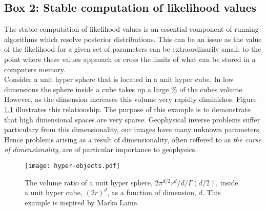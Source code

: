 \begin{tcolorbox}
\chapter{Box 2: Stable computation of likelihood values}
\label{Box2}

The stable computation of likelihood values is an essential component of running algorithms which resolve posterior distributions. This can be an issue as the value of the likelihood for a given set of parameters can be extraordinarily small, to the point where these values approach or cross the limits of what can be stored in a computers memory. \\

Consider a unit hyper sphere that is located in a unit hyper cube. In low dimensions the sphere inside a cube takes up a large \% of the cubes volume. However, as the dimension increases this volume very rapidly diminishes. Figure \ref{hyper-objects} illustrates this relationship. The purpose of this example is to demonstrate that high dimensional spaces are very sparse. Geophysical inverse problems suffer particulary from this dimensionality, our images have many unknown parameters. Hence problems arising as a result of dimensionality, often reffered to as \textit{the curse of dimensionality}, are of particular importance to geophysics. \\

\begin{figure}[H]
	\centering
	\texttt{[image: hyper-objects.pdf]}
	\caption{The volume ratio of a unit hyper sphere, $2\pi^{d/2}r^d/d/\Gamma(d/2)$, inside a unit hyper cube, $(2r)^d$, as a function of dimension, $d$. This example is inspired by Marko Laine.}
	\label{hyper-objects}
\end{figure}

\end{tcolorbox}


